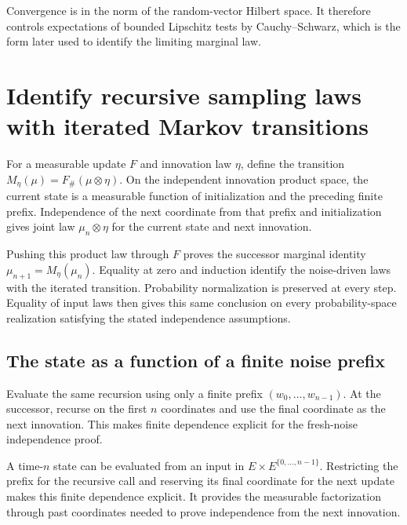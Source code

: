 \documentclass[11pt,a4paper]{article}
\begin{document}
Convergence is in the norm of the random-vector Hilbert space. It therefore controls expectations of bounded Lipschitz tests by Cauchy–Schwarz, which is the form later used to identify the limiting marginal law.


\section{\texorpdfstring{Identify recursive sampling laws with iterated Markov transitions}{Identify recursive sampling laws with iterated Markov transitions}}


For a measurable update \(F\) and innovation law \(\eta\), define the transition \(M_\eta(\mu)=F_\#(\mu\otimes\eta)\). On the independent innovation product space, the current state is a measurable function of initialization and the preceding finite prefix. Independence of the next coordinate from that prefix and initialization gives joint law \(\mu_n\otimes\eta\) for the current state and next innovation.



Pushing this product law through \(F\) proves the successor marginal identity \(\mu_{n+1}=M_\eta(\mu_n)\). Equality at zero and induction identify the noise-driven laws with the iterated transition. Probability normalization is preserved at every step. Equality of input laws then gives this same conclusion on every probability-space realization satisfying the stated independence assumptions.


\subsection{\texorpdfstring{The state as a function of a finite noise prefix}{The state as a function of a finite noise prefix}}


Evaluate the same recursion using only a finite prefix \((w_0,\ldots,w_{n-1})\). At the successor, recurse on the first \(n\) coordinates and use the final coordinate as the next innovation. This makes finite dependence explicit for the fresh-noise independence proof.



A time-\(n\) state can be evaluated from an input in \(E\times E^{\{0,\ldots,n-1\}}\). Restricting the prefix for the recursive call and reserving its final coordinate for the next update makes this finite dependence explicit. It provides the measurable factorization through past coordinates needed to prove independence from the next innovation.
\end{document}
